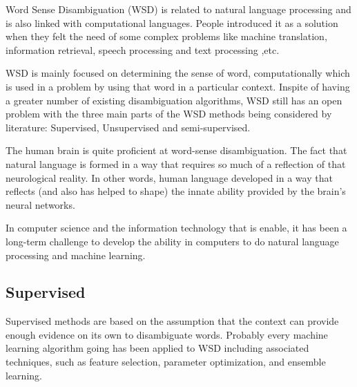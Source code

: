Word Sense Disambiguation (WSD) is related to natural language processing and is also linked with computational languages. People introduced it as a solution when they felt the need of some complex problems like machine translation, information retrieval, speech processing and text processing ,etc. 

WSD is mainly focused on determining the sense of word, computationally which is used in a problem by using that word in a particular context. Inspite of having a greater number of existing disambiguation algorithms, WSD still has an open problem with the three main parts of the WSD methods being considered by literature: Supervised, Unsupervised and semi-supervised. 

The human brain is quite proficient at word-sense disambiguation. 
The fact that natural language is formed in a way that requires so much of a reflection of that neurological reality. In other words, human language developed in a way that reflects (and also has helped to shape) the innate ability provided by the brain's neural networks. 

In computer science and the information technology that is enable, it has been a long-term challenge to develop the ability in computers to do natural language processing and machine learning. 

\subsection*{Supervised}

Supervised methods are based on the assumption that the context can provide enough evidence on its own to disambiguate words. Probably every machine learning algorithm going has been applied to WSD including associated techniques, such as feature selection, parameter optimization, and ensemble learning.

